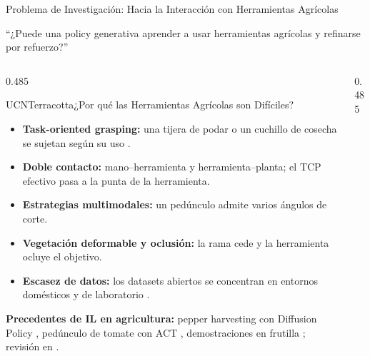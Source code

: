 \documentclass[aspectratio=169,10pt,xcolor={dvipsnames,table}]{beamer}
\newcommand{\BannerFont}{\fontsize{7.5}{9.2}\selectfont\bfseries}       %
\newcommand{\BannerArc}{1.5pt}             %
\newcommand{\BannerRule}{0.5pt}            %
\newcommand{\BannerLeftRule}{2.5pt}        %
\newcommand{\CardHeightDouble}{42.5mm}     %
\newcommand{\BannerCentral}[2][UCNCyan]{%
  \begin{tcolorbox}[
    enhanced,
    colback=#1!10,
    colframe=#1,
    boxrule=\BannerRule,
    leftrule=\BannerLeftRule,
    arc=\BannerArc,
    top=0.35mm, bottom=0.35mm, left=2mm, right=2mm
  ]
    {\BannerFont\raggedright\textcolor{UCNBlue}{#2}\par}
  \end{tcolorbox}%
  \vspace{-2.5mm}%
}
\begin{document}
\begin{frame}{Problema de Investigación: Hacia la Interacción con Herramientas Agrícolas}
  \BannerCentral[UCNTerracotta]{``¿Puede una policy generativa aprender a usar herramientas agrícolas y refinarse por refuerzo?''}
  \vspace{0.8mm}
  \begin{columns}[T, onlytextwidth]
    \begin{column}{0.485\textwidth}
      \begin{Card}[height=\CardHeightDouble]{UCNTerracotta}{¿Por qué las Herramientas Agrícolas son Difíciles?}
        {\fontsize{5.3}{6.3}\selectfont\raggedright
        \begin{itemize}\setlength{\itemsep}{0.6pt}
          \item[\textcolor{UCNTerracotta}{$\blacksquare$}] \textbf{Task-oriented grasping:} una tijera de podar o un cuchillo de cosecha se sujetan según su uso \cite{fang2018tog}.
          \item[\textcolor{UCNTerracotta}{$\blacksquare$}] \textbf{Doble contacto:} mano--herramienta y herramienta--planta; el TCP efectivo pasa a la punta de la herramienta.
          \item[\textcolor{UCNTerracotta}{$\blacksquare$}] \textbf{Estrategias multimodales:} un pedúnculo admite varios ángulos de corte.
          \item[\textcolor{UCNTerracotta}{$\blacksquare$}] \textbf{Vegetación deformable y oclusión:} la rama cede y la herramienta ocluye el objetivo.
          \item[\textcolor{UCNTerracotta}{$\blacksquare$}] \textbf{Escasez de datos:} los datasets abiertos se concentran en entornos domésticos y de laboratorio \cite{oxe2024openx}.
        \end{itemize}
        \vspace{0.3mm}
        \textcolor{TextDark!75}{\textbf{Precedentes de IL en agricultura:} pepper harvesting con Diffusion Policy \cite{kim2025pepper}, pedúnculo de tomate con ACT \cite{rong2026tomato}, demostraciones en frutilla \cite{hou2025sroi}; revisión en \cite{mahmoudi2024imitation}.}\par}
      \end{Card}
    \end{column}
    \begin{column}{0.485\textwidth}

\end{column}
\end{columns}
\end{frame}
\end{document}
